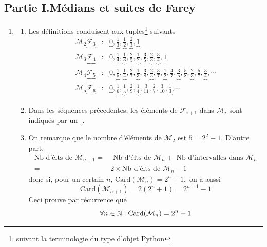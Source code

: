 \subsection*{Partie I.\quad M{\'e}dians et suites de Farey}
\begin{enumerate}
\item  \begin{enumerate}
 \item Les d{\'e}finitions conduisent aux tuples\footnote{suivant la terminologie du type d'objet Python} suivants 
\begin{align*}
\mathcal{M}_{2} \underbrace{\mathcal{F}_{3}}&:&  \underbrace{0}, \underbrace{\frac{1}{3}}, \underbrace{\frac{1}{2}}, \underbrace{\frac{2}{3}}, \underbrace{1} \\
\mathcal{M}_{3} \underbrace{\mathcal{F}_{4}}&:&  \underbrace{0},\underbrace{\frac{1}{4}},\underbrace{\frac{1}{3}},\frac{2}{5}, \underbrace{\frac{1}{2}}, \frac{3}{5},\underbrace{\frac{2}{3}},\underbrace{\frac{3}{4}},\underbrace{1} \\
\mathcal{M}_{4} \underbrace{\mathcal{F}_{5}}&:&  \underbrace{0},\underbrace{\frac{1}{5}}, \underbrace{\frac{1}{4}}, \frac{2}{7}, \underbrace{\frac{1}{3}}, \frac{3}{8}, \underbrace{\frac{2}{5}}, \frac{3}{7}, \underbrace{\frac{1}{2}},  \frac{4}{7}, \underbrace{\frac{3}{5}}, \frac{5}{8}, \underbrace{\frac{2}{3}}, \frac{5}{7}, \underbrace{\frac{3}{4}}, \cdots \\
\mathcal{M}_{5} \underbrace{\mathcal{F}_{6}}&:&  \underbrace{0}, \underbrace{\frac{1}{6}}, \underbrace{\frac{1}{5}}, \frac{2}{9}, \underbrace{\frac{1}{4}}, \frac{3}{11}, \frac{2}{7}, \frac{3}{10}, \underbrace{\frac{1}{3}}, \cdots
\end{align*}
\item Dans les séquences précedentes, les éléments de $\mathcal F _{i+1}$ dans $\mathcal M_i$ sont indiqués par un $\underbrace{}$.
\item On remarque que le nombre d'{\'e}l{\'e}ments de $\mathcal{M}_{2}$ est $5=2^{2}+1$. D'autre part,
\begin{align*}
\text{Nb d'élts de }\mathcal{M}_{n+1} =& \text{ Nb d'élts de }\mathcal{M}_{n}+\text{ Nb d'intervalles dans }\mathcal{M}_{n} \\
=& 2\times\text{Nb d'élts de }\mathcal{M}_{n}-1
\end{align*}
donc si, pour un certain $n$,  $\text{Card}(\mathcal{M}_{n})=2^{n}+1,$ on a aussi
\begin{displaymath}
\text{Card}(\mathcal{M}_{n+1})=2(2^{n}+1)=2^{n+1}-1 
\end{displaymath}
Ceci prouve par r{\'e}currence que 
\begin{displaymath}
 \forall n \in \mathbb{N} : \text{Card}(\mathcal{M}_{n})=2^{n}+1
\end{displaymath}
\end{enumerate}


\end{enumerate}
